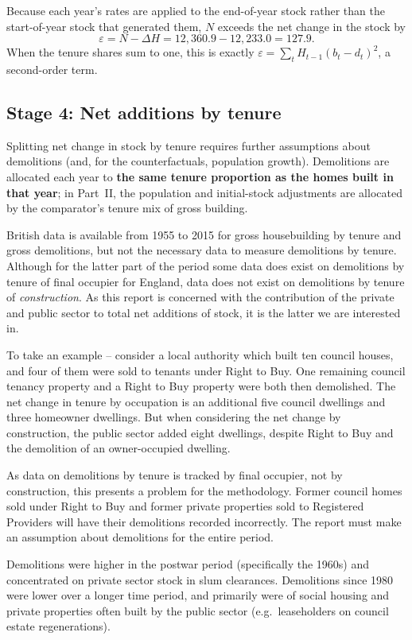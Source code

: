 \documentclass[11pt,a4paper]{article}
\begin{document}
Because each year's rates are applied to the end-of-year stock rather than the
start-of-year stock that generated them, $N$ exceeds the net change in the stock by
\[
  \varepsilon = N - \Delta H = 12{,}360.9 - 12{,}233.0 = 127.9.
\]
When the tenure shares sum to one, this is exactly
$\varepsilon = \sum_{t} H_{t-1}(b_t - d_t)^2$, a second-order term.

\subsection*{Stage 4: Net additions by tenure}

Splitting net change in stock by tenure requires further assumptions about demolitions
(and, for the counterfactuals, population growth). Demolitions are allocated each year to
\textbf{the same tenure proportion as the homes built in that year}; in Part~II, the
population and initial-stock adjustments are allocated by the comparator's tenure mix of
gross building.

British data is available from 1955 to 2015 for gross housebuilding by tenure and gross
demolitions, but not the necessary data to measure demolitions by tenure. Although for the
latter part of the period some data does exist on demolitions by tenure of final occupier
for England, data does not exist on demolitions by tenure of \emph{construction}. As this
report is concerned with the contribution of the private and public sector to total net
additions of stock, it is the latter we are interested in.

To take an example -- consider a local authority which built ten council houses, and four
of them were sold to tenants under Right to Buy. One remaining council tenancy property
and a Right to Buy property were both then demolished. The net change in tenure by
occupation is an additional five council dwellings and three homeowner dwellings. But when
considering the net change by construction, the public sector added eight dwellings,
despite Right to Buy and the demolition of an owner-occupied dwelling.

As data on demolitions by tenure is tracked by final occupier, not by construction, this
presents a problem for the methodology. Former council homes sold under Right to Buy and
former private properties sold to Registered Providers will have their demolitions
recorded incorrectly. The report must make an assumption about demolitions for the entire
period.

Demolitions were higher in the postwar period (specifically the 1960s) and concentrated
on private sector stock in slum clearances. Demolitions since 1980 were lower over a
longer time period, and primarily were of social housing and private properties often
built by the public sector (e.g.\ leaseholders on council estate regenerations).
\end{document}
